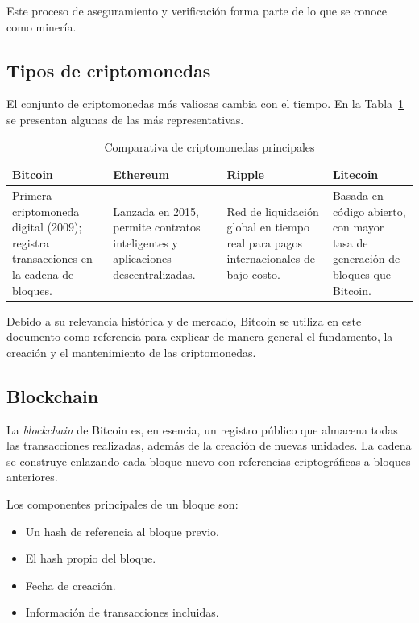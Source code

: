 \documentclass[12pt]{article}
\begin{document}
Este proceso de aseguramiento y verificación forma parte de lo que se
conoce como minería.

\subsection{Tipos de criptomonedas}

El conjunto de criptomonedas más valiosas cambia con el tiempo. En la
Tabla~\ref{tab:cripto-comparativa} se presentan algunas de las más
representativas.

\begin{table}[ht]
  \centering
  \caption{Comparativa de criptomonedas principales}
  \label{tab:cripto-comparativa}
  \begin{tabularx}{\textwidth}{XXXX}
    \toprule
    \textbf{Bitcoin} & \textbf{Ethereum} & \textbf{Ripple} &
    \textbf{Litecoin} \\ \midrule

    Primera criptomoneda digital (2009); registra transacciones en la
    cadena de bloques. &
    Lanzada en 2015, permite contratos inteligentes y aplicaciones
    descentralizadas. &
    Red de liquidación global en tiempo real para pagos
    internacionales de bajo costo. &
    Basada en código abierto, con mayor tasa de generación de bloques
    que Bitcoin. \\

    \bottomrule
  \end{tabularx}
\end{table}

Debido a su relevancia histórica y de mercado, Bitcoin se utiliza en
este documento como referencia para explicar de manera general el
fundamento, la creación y el mantenimiento de las criptomonedas.

\subsection{Blockchain}

La \textit{blockchain} de Bitcoin es, en esencia, un registro público
que almacena todas las transacciones realizadas, además de la creación
de nuevas unidades. La cadena se construye enlazando cada bloque nuevo
con referencias criptográficas a bloques anteriores.

Los componentes principales de un bloque son:

\begin{itemize}
  \item Un hash de referencia al bloque previo.
  \item El hash propio del bloque.
  \item Fecha de creación.
  \item Información de transacciones incluidas.
\end{itemize}
\end{document}
